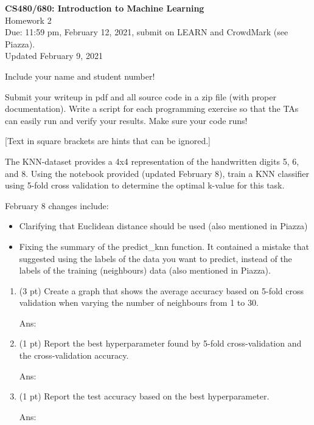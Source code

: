 \documentclass[10pt,letter,notitlepage]{article}
\newcommand{\red}[1]{{\color{red}#1}}
\newcommand{\ans}[1]{{\color{orange}\textsf{Ans}: #1}}
\newcounter{exercise}
\begin{document}
\begin{center}
\large{\textbf{CS480/680: Introduction to Machine Learning} \\ Homework 2\\ \red{Due: 11:59 pm, February 12, 2021}, \red{submit on LEARN and CrowdMark (see Piazza)}.} \\
  \red{Updated February 9, 2021}

Include your name and student number!

\end{center}

\begin{center}
Submit your writeup in pdf and all source code in a zip file (with proper documentation). Write a script for each programming exercise so that the TAs can easily run and verify your results. Make sure your code runs!

[Text in square brackets are hints that can be ignored.]
\end{center}



\begin{exercise}
  The KNN-dataset provides a 4x4 representation of the handwritten digits 5, 6, and 8. Using the notebook provided \red{(updated February 8)}, train a KNN classifier using 5-fold cross validation to determine the optimal k-value for this task.

  \red{
  February 8 changes include:
  \begin{itemize}
    \item Clarifying that Euclidean distance should be used (also mentioned in Piazza)
    \item Fixing the summary of the predict\_knn function. It contained a mistake that suggested using the labels of the data you want to predict, instead of the labels of the training (neighbours) data (also mentioned in Piazza).
  \end{itemize}
  }

\begin{enumerate}
\item (3 pt) Create a graph that shows the average accuracy based on 5-fold cross validation when varying the number of neighbours from 1 to 30.

\ans{}

\item (1 pt) Report the best hyperparameter found by 5-fold cross-validation and the cross-validation accuracy.

\ans{} 

\item (1 pt) Report the test accuracy based on the best hyperparameter.

\ans{} 
\end{enumerate}
\end{exercise}
\end{document}
